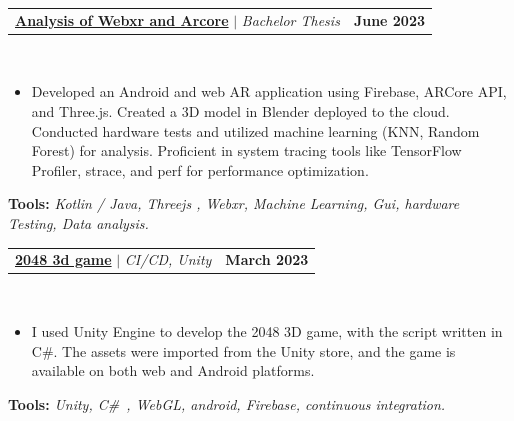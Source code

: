 \documentclass[letterpaper,11pt]{article}
\makeatletter
\newcommand{\resumeItem}[1]{
  \item\small{
    {#1 \vspace{-2pt}}
  }
}
\newcommand{\resumeProjectHeading}[2]{
    \item
    \begin{tabular*}{1.001\textwidth}{l@{\extracolsep{\fill}}r}
      \small#1 & \textbf{\small #2}\\
    \end{tabular*}\vspace{-7pt}
}
\newcommand{\resumeItemListStart}{\begin{itemize}}
\newcommand{\resumeItemListEnd}{\end{itemize}\vspace{-5pt}}
\makeatother
\begin{document}
            

                

 \resumeProjectHeading
          {\textbf{\href{https://www.yakkshit.com/#project-1}{Analysis of Webxr and Arcore}} $|$ \emph{Bachelor Thesis \faGithub}}{June 2023}\\
          \vspace{9pt}
          \vspace{-8pt}
          \resumeItemListStart
            \resumeItem{Developed an Android and web AR application using Firebase, ARCore API, and Three.js. Created a 3D model in Blender deployed to the cloud. Conducted hardware tests and utilized machine learning (KNN, Random Forest) for analysis. Proficient in system tracing tools like TensorFlow Profiler, strace, and perf for performance optimization.}
          \resumeItemListEnd 
          \textbf{Tools:}\emph{
                                Kotlin / Java, Threejs , Webxr, Machine Learning, Gui, hardware Testing, Data analysis.}

        \vspace{-18pt}
 
                

 \resumeProjectHeading
          {\textbf{\href{https://github.com/yakkshit/2048-3d-master.git}{2048 3d game}} $|$ \emph{CI/CD, Unity \faGithub}}{March 2023}\\
          \vspace{9pt}
          \vspace{-8pt}
          \resumeItemListStart
            \resumeItem{I used Unity Engine to develop the 2048 3D game, with the script written in C#. The assets were imported from the Unity store, and the game is available on both web and Android platforms.}
          \resumeItemListEnd 
          \textbf{Tools:}\emph{
                                Unity, C\#\ , WebGL, android, Firebase, continuous integration.}
\end{document}

